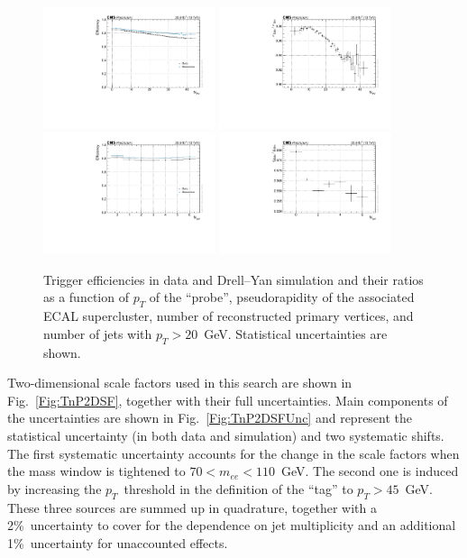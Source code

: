 \begin{figure}
  \includegraphics[width=0.45\textwidth]{fig/chapt7/trigger_eff/eff_PV.pdf}
  \includegraphics[width=0.45\textwidth]{fig/chapt7/trigger_eff/sf_PV.pdf} \\
  \includegraphics[width=0.45\textwidth]{fig/chapt7/trigger_eff/eff_jets.pdf}
  \includegraphics[width=0.45\textwidth]{fig/chapt7/trigger_eff/sf_jets.pdf}
  \caption{Trigger efficiencies in data and Drell--Yan simulation and their ratios as a function of $p_{T}$ of the ``probe'', pseudorapidity of the associated ECAL supercluster, number of reconstructed primary vertices, and number of jets with $p_{T} > 20$~GeV. Statistical uncertainties are shown.}
  \label{Fig:TnP1DEff}
\end{figure}

Two-dimensional scale factors used in this search are shown in Fig.~\ref{Fig:TnP2DSF}, together with their full uncertainties.
Main components of the uncertainties are shown in Fig.~\ref{Fig:TnP2DSFUnc} and represent the statistical uncertainty (in both data and simulation) and two systematic shifts.
The first systematic uncertainty accounts for the change in the scale factors when the mass window is tightened to $70 < m_{ee} < 110$~GeV.
The second one is induced by increasing the $p_{T}$~threshold in the definition of the ``tag'' to $p_{T} > 45$~GeV.
These three sources are summed up in quadrature, together with a 2\%~uncertainty to cover for the dependence on jet multiplicity and an additional 1\%~uncertainty for unaccounted effects.

